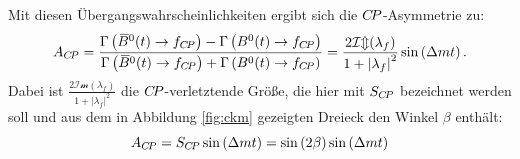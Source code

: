 Mit diesen Übergangswahrscheinlichkeiten ergibt sich die ${C\!P}$-Asymmetrie zu:
\begin{equation}
A_{C\!P}=\frac{\Gamma\left({{\kern 0.18em\overline{\kern -0.18em B}{}}{}^0}(t)\rightarrow f_{C\!P}\right)-\Gamma\left({{B}^0}(t)\rightarrow f_{C\!P}\right)}{\Gamma\left({{\kern 0.18em\overline{\kern -0.18em B}{}}{}^0}(t)\rightarrow f_{C\!P}\right)+\Gamma\left({{B}^0}(t)\rightarrow f_{C\!P}\right)}=\frac{2\mathcal{Im}(\lambda_f)}{1+\left|\lambda_f\right|^2}\sin\left({\Delta m} t\right).\label{eq:cpv}
\end{equation}
Dabei ist $\frac{2\mathcal{Im}(\lambda_f)}{1+\left|\lambda_f\right|^2}$ die ${C\!P}$-verletztende Größe, die hier mit $S_{C\!P}$ bezeichnet werden soll und aus dem in Abbildung \ref{fig:ckm} gezeigten Dreieck den Winkel $\beta$ enthält: 
\begin{equation}
A_{C\!P}=S_{C\!P}\sin\left({\Delta m} t\right)=\sin\left(2\beta\right)\sin\left({\Delta m} t\right)
\end{equation}

